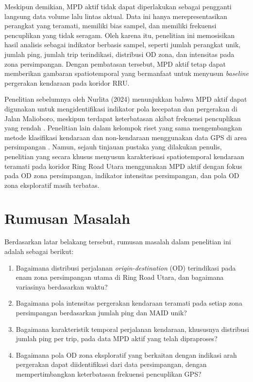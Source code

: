 Meskipun demikian, MPD aktif tidak dapat diperlakukan sebagai pengganti langsung data volume lalu lintas aktual. Data ini hanya merepresentasikan perangkat yang teramati, memiliki bias sampel, dan memiliki frekuensi pencuplikan yang tidak seragam. Oleh karena itu, penelitian ini memosisikan hasil analisis sebagai indikator berbasis sampel, seperti jumlah perangkat unik, jumlah ping, jumlah trip terindikasi, distribusi OD zona, dan intensitas pada zona persimpangan. Dengan pembatasan tersebut, MPD aktif tetap dapat memberikan gambaran spatiotemporal yang bermanfaat untuk menyusun \textit{baseline} pergerakan kendaraan pada koridor RRU.

Penelitian sebelumnya oleh Nurlita (2024) menunjukkan bahwa MPD aktif dapat digunakan untuk mengidentifikasi indikator pola kecepatan dan pergerakan di Jalan Malioboro, meskipun terdapat keterbatasan akibat frekuensi pencuplikan yang rendah \cite{nurlita2024}. Penelitian lain dalam kelompok riset yang sama mengembangkan metode klasifikasi kendaraan dan non-kendaraan menggunakan data GPS di area persimpangan \cite{rakhman2024}. Namun, sejauh tinjauan pustaka yang dilakukan penulis, penelitian yang secara khusus menyusun karakterisasi spatiotemporal kendaraan teramati pada koridor Ring Road Utara menggunakan MPD aktif dengan fokus pada OD zona persimpangan, indikator intensitas persimpangan, dan pola OD zona eksploratif masih terbatas.

\section{Rumusan Masalah}

Berdasarkan latar belakang tersebut, rumusan masalah dalam penelitian ini adalah sebagai berikut:
\begin{enumerate}
    \item Bagaimana distribusi perjalanan \textit{origin-destination} (OD) terindikasi pada enam zona persimpangan utama di Ring Road Utara, dan bagaimana variasinya berdasarkan waktu?
    \item Bagaimana pola intensitas pergerakan kendaraan teramati pada setiap zona persimpangan berdasarkan jumlah ping dan MAID unik?
    \item Bagaimana karakteristik temporal perjalanan kendaraan, khususnya distribusi jumlah ping per trip, pada data MPD aktif yang telah dipraproses?
    \item Bagaimana pola OD zona eksploratif yang berkaitan dengan indikasi arah pergerakan dapat diidentifikasi dari data persimpangan, dengan mempertimbangkan keterbatasan frekuensi pencuplikan GPS?
\end{enumerate}

